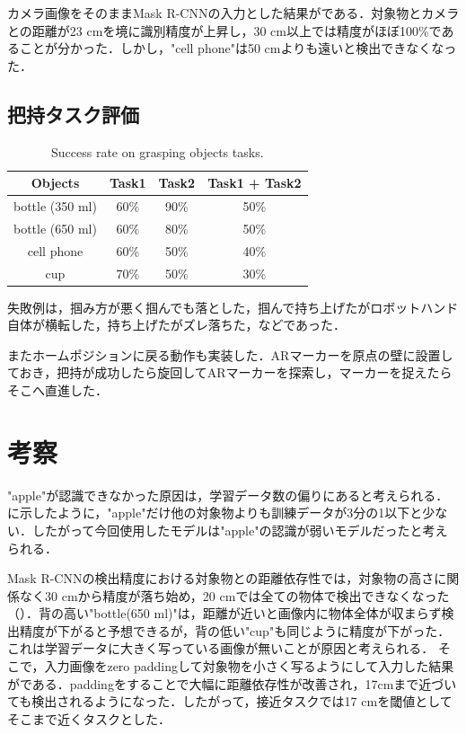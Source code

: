 カメラ画像をそのままMask R-CNNの入力とした結果がである．対象物とカメラとの距離が23 cmを境に識別精度が上昇し，30 cm以上では精度がほぼ100\%であることが分かった．しかし，"cell phone"は50 cmよりも遠いと検出できなくなった．

\subsection{把持タスク評価}


\begin{table}[H]
    \centering
    \caption{Success rate on grasping objects tasks.}
    \begin{tabular}{cccc}\toprule
        Objects & Task1 & Task2 & Task1 + Task2 \\ \midrule
        bottle (350 ml) & 60\% & 90\% & 50\% \\
        bottle (650 ml) & 60\% & 80\% & 50\% \\
        cell phone & 60\% & 50\% & 40\% \\ 
        cup & 70\% & 50\% & 30\% \\ \bottomrule
    \end{tabular} 
    \label{tab:把持成功率}
\end{table}

失敗例は，掴み方が悪く掴んでも落とした，掴んで持ち上げたがロボットハンド自体が横転した，持ち上げたがズレ落ちた，などであった．

またホームポジションに戻る動作も実装した．ARマーカーを原点の壁に設置しておき，把持が成功したら旋回してARマーカーを探索し，マーカーを捉えたらそこへ直進した．


\section{考察}
"apple"が認識できなかった原因は，学習データ数の偏りにあると考えられる．に示したように，"apple"だけ他の対象物よりも訓練データが3分の1以下と少ない．したがって今回使用したモデルは"apple"の認識が弱いモデルだったと考えられる．

Mask R-CNNの検出精度における対象物との距離依存性では，対象物の高さに関係なく30 cmから精度が落ち始め，20 cmでは全ての物体で検出できなくなった（）．背の高い"bottle(650 ml)"は，距離が近いと画像内に物体全体が収まらず検出精度が下がると予想できるが，背の低い"cup"も同じように精度が下がった．これは学習データに大きく写っている画像が無いことが原因と考えられる．
そこで，入力画像をzero paddingして対象物を小さく写るようにして入力した結果がである．paddingをすることで大幅に距離依存性が改善され，17cmまで近づいても検出されるようになった．したがって，接近タスクでは17 cmを閾値としてそこまで近くタスクとした．


